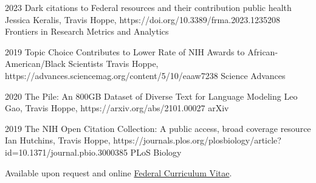 \documentclass[]{scrartcl}
\begin{document}
\begin{cleanCV}
\Paper
{2023}
{Dark citations to Federal resources and their contribution public health}
{Jessica Keralis, Travis Hoppe, \etal}
{https://doi.org/10.3389/frma.2023.1235208}
{Frontiers in Research Metrics and Analytics}

\Paper
{2019}
{Topic Choice Contributes to Lower Rate of NIH Awards to African-American/Black Scientists}
{Travis Hoppe, \etal}
{https://advances.sciencemag.org/content/5/10/eaaw7238}
{Science Advances}

\Paper
{2020}
{The Pile: An 800GB Dataset of Diverse Text for Language Modeling}
{Leo Gao, Travis Hoppe, \etal}
{https://arxiv.org/abs/2101.00027}
{arXiv}

\Paper
{2019}
{The NIH Open Citation Collection: A public access, broad coverage resource}
{Ian Hutchins, Travis Hoppe, \etal}
{https://journals.plos.org/plosbiology/article?id=10.1371/journal.pbio.3000385}
{PLoS Biology}





Available upon request and online \href{https://github.com/thoppe/personal_cv/blob/master/tex/pdf/Travis_Hoppe_Federal_Resume.pdf?raw=true}{Federal Curriculum Vitae}.


\end{cleanCV}
\end{document}

